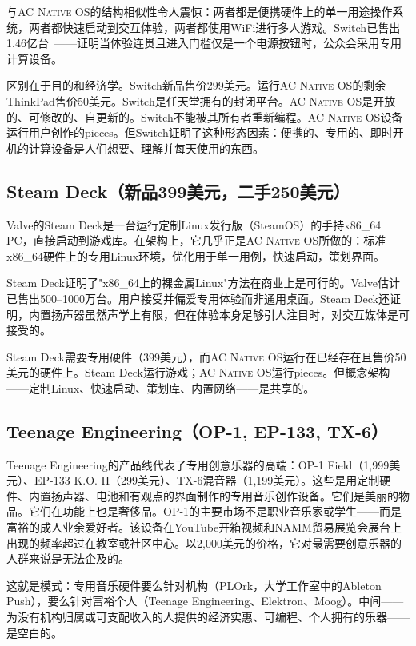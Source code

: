 \documentclass[10pt,letterpaper,twocolumn]{article}
\newcommand{\acos}{\textsc{AC Native OS}}
\begin{document}
与\acos{}的结构相似性令人震惊：两者都是便携硬件上的单一用途操作系统，两者都快速启动到交互体验，两者都使用WiFi进行多人游戏。Switch已售出1.46亿台~\citep{nintendo2024earnings}——证明当体验连贯且进入门槛仅是一个电源按钮时，公众会采用专用计算设备。

区别在于目的和经济学。Switch新品售价299美元。运行\acos{}的剩余ThinkPad售价50美元。Switch是任天堂拥有的封闭平台。\acos{}是开放的、可修改的、自更新的。Switch不能被其所有者重新编程。\acos{}设备运行用户创作的pieces。但Switch证明了这种形态因素：便携的、专用的、即时开机的计算设备是人们想要、理解并每天使用的东西。

\subsection{Steam Deck（新品399美元，二手250美元）}

Valve的Steam Deck是一台运行定制Linux发行版（SteamOS）的手持x86\_64 PC，直接启动到游戏库。在架构上，它几乎正是\acos{}所做的：标准x86\_64硬件上的专用Linux环境，优化用于单一用例，快速启动，策划界面。

Steam Deck证明了"x86\_64上的裸金属Linux"方法在商业上是可行的。Valve估计已售出500--1000万台。用户接受并偏爱专用体验而非通用桌面。Steam Deck还证明，内置扬声器虽然声学上有限，但在体验本身足够引人注目时，对交互媒体是可接受的。

Steam Deck需要专用硬件（399美元），而\acos{}运行在已经存在且售价50美元的硬件上。Steam Deck运行游戏；\acos{}运行pieces。但概念架构——定制Linux、快速启动、策划库、内置网络——是共享的。

\subsection{Teenage Engineering（OP-1, EP-133, TX-6）}

Teenage Engineering的产品线代表了专用创意乐器的高端：OP-1 Field（1,999美元）、EP-133 K.O. II（299美元）、TX-6混音器（1,199美元）。这些是用定制硬件、内置扬声器、电池和有观点的界面制作的专用音乐创作设备。它们是美丽的物品。它们在功能上也是奢侈品。OP-1的主要市场不是职业音乐家或学生——而是富裕的成人业余爱好者。该设备在YouTube开箱视频和NAMM贸易展览会展台上出现的频率超过在教室或社区中心。以2,000美元的价格，它对最需要创意乐器的人群来说是无法企及的。

这就是模式：专用音乐硬件要么针对机构（PLOrk，大学工作室中的Ableton Push），要么针对富裕个人（Teenage Engineering、Elektron、Moog）。中间——为没有机构归属或可支配收入的人提供的经济实惠、可编程、个人拥有的乐器——是空白的。
\end{document}
